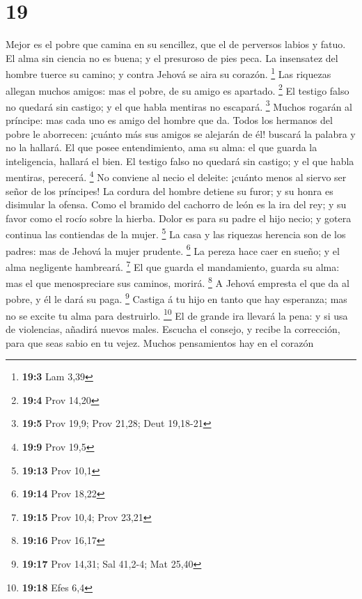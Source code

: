 \hypertarget{section-18}{%
\section{19}\label{section-18}}

 Mejor es el pobre que camina en su sencillez, que el de
perversos labios y fatuo.  El alma sin ciencia no es buena;
y el presuroso de pies peca.  La insensatez del hombre
tuerce su camino; y contra Jehová se aira su corazón. \footnote{\textbf{19:3}
  Lam 3,39}  Las riquezas allegan muchos amigos: mas el
pobre, de su amigo es apartado. \footnote{\textbf{19:4} Prov 14,20}
 El testigo falso no quedará sin castigo; y el que habla
mentiras no escapará. \footnote{\textbf{19:5} Prov 19,9; Prov 21,28;
  Deut 19,18-21}  Muchos rogarán al príncipe: mas cada uno
es amigo del hombre que da.  Todos los hermanos del pobre le
aborrecen: ¡cuánto más sus amigos se alejarán de él! buscará la palabra
y no la hallará.  El que posee entendimiento, ama su alma:
el que guarda la inteligencia, hallará el bien.  El testigo
falso no quedará sin castigo; y el que habla mentiras, perecerá.
\footnote{\textbf{19:9} Prov 19,5}  No conviene al necio el
deleite: ¡cuánto menos al siervo ser señor de los príncipes!
 La cordura del hombre detiene su furor; y su honra es
disimular la ofensa.  Como el bramido del cachorro de león
es la ira del rey; y su favor como el rocío sobre la hierba.
 Dolor es para su padre el hijo necio; y gotera continua
las contiendas de la mujer. \footnote{\textbf{19:13} Prov 10,1}
 La casa y las riquezas herencia son de los padres: mas de
Jehová la mujer prudente. \footnote{\textbf{19:14} Prov 18,22}
 La pereza hace caer en sueño; y el alma negligente
hambreará. \footnote{\textbf{19:15} Prov 10,4; Prov 23,21} 
El que guarda el mandamiento, guarda su alma: mas el que menospreciare
sus caminos, morirá. \footnote{\textbf{19:16} Prov 16,17} 
A Jehová empresta el que da al pobre, y él le dará su paga. \footnote{\textbf{19:17}
  Prov 14,31; Sal 41,2-4; Mat 25,40}  Castiga á tu hijo en
tanto que hay esperanza; mas no se excite tu alma para destruirlo.
\footnote{\textbf{19:18} Efes 6,4}  El de grande ira
llevará la pena: y si usa de violencias, añadirá nuevos males.
 Escucha el consejo, y recibe la corrección, para que seas
sabio en tu vejez.  Muchos pensamientos hay en el corazón
